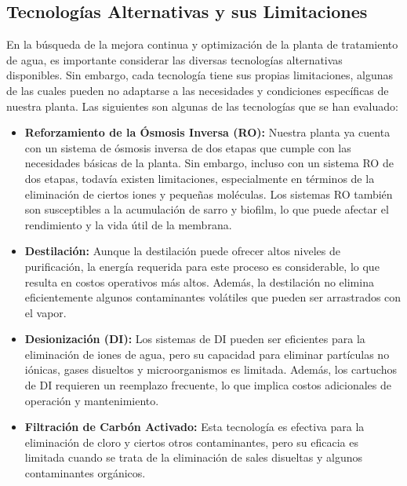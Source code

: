 \subsection{Tecnologías Alternativas y sus Limitaciones}

En la búsqueda de la mejora continua y optimización de la planta de tratamiento de agua,
es importante considerar las diversas tecnologías alternativas disponibles.
Sin embargo, cada tecnología tiene sus propias limitaciones, algunas de las
cuales pueden no adaptarse a las necesidades y condiciones específicas de nuestra planta.
Las siguientes son algunas de las tecnologías que se han evaluado:

\begin{itemize}
    \item \textbf{Reforzamiento de la Ósmosis Inversa (RO):}  Nuestra planta ya cuenta con
          un sistema de ósmosis inversa de dos etapas que cumple con las necesidades
          básicas de la planta. Sin embargo, incluso con un sistema RO de dos etapas,
          todavía existen limitaciones, especialmente en términos de la eliminación de
          ciertos iones y pequeñas moléculas. Los sistemas RO también son susceptibles a
          la acumulación de sarro y biofilm, lo que puede afectar el rendimiento y
          la vida útil de la membrana.

    \item \textbf{Destilación:}  Aunque la destilación puede ofrecer altos niveles de
          purificación, la energía requerida para este proceso es considerable,
          lo que resulta en costos operativos más altos. Además, la destilación
          no elimina eficientemente algunos contaminantes volátiles que pueden ser arrastrados con el vapor.

    \item \textbf{Desionización (DI): } Los sistemas de DI pueden ser eficientes para
          la eliminación de iones de agua, pero su capacidad para eliminar
          partículas no iónicas, gases disueltos y microorganismos es limitada.
          Además, los cartuchos de DI requieren un reemplazo frecuente, lo que
          implica costos adicionales de operación y mantenimiento.

    \item \textbf{Filtración de Carbón Activado:}  Esta tecnología es efectiva para la
          eliminación de cloro y ciertos otros contaminantes, pero su eficacia es
          limitada cuando se trata de la eliminación de sales disueltas y
          algunos contaminantes orgánicos.

\end{itemize}

